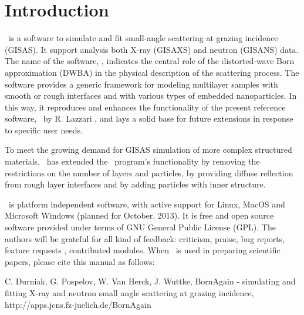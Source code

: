 \newpage
\chapter*{Introduction}


\BornAgain\ is a  software to simulate and fit small-angle
scattering at grazing incidence (GISAS). 
It support analysis both  X-ray (GISAXS) and neutron (GISANS) data.
The name of the software,
\BornAgain , indicates the central role of the distorted-wave Born
approximation (DWBA) in the physical description of the
scattering process. The software provides a generic framework for modeling multilayer samples with smooth or
rough interfaces and with various types of embedded nano\-particles. In this way, it reproduces and enhances the
functionality of the present reference software, \IsGISAXS\ by
R. Lazzari \cite{Lazzari:vi0158}, and lays a solid base for future
extensions in response to specific user needs. 

To meet the growing demand for GISAS simulation of more
complex structured materials, \BornAgain\ has extended the \IsGISAXS\ program’s functionality by removing the
restrictions on the number of layers and particles, by providing diffuse reflection from rough layer interfaces and
by adding particles with inner structure.

\BornAgain\ is platform independent software, with active support for Linux, MacOS and 
Microsoft Windows (planned for October, 2013). 
It is free and open source software provided under terms
of GNU General Public License (GPL). The authors will be grateful for all kind of
feedback: criticism, praise, bug reports, feature requests , contributed modules.
When \BornAgain\ is used in preparing scientific papers,
please cite this manual as follows: 
\begin{center}
C. Durniak, G. Pospelov, W. Van Herck, J. Wuttke, \newline
BornAgain - simulating and fitting X-ray and neutron small angle  scattering at grazing incidence, \newline
http://apps.jcns.fz-juelich.de/BornAgain
\end{center}



